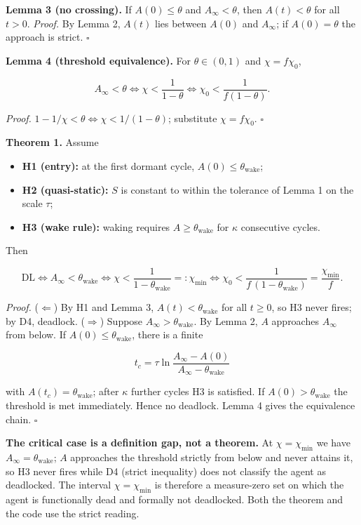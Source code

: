 \documentclass[11pt,a4paper]{article}
\providecommand{\tightlist}{\setlength{\itemsep}{0pt}\setlength{\parskip}{0pt}}
\begin{document}
\textbf{Lemma 3 (no crossing).} If \(A(0)\le\theta\) and \(A_\infty<\theta\), then
\(A(t)<\theta\) for all \(t>0\). \emph{Proof.} By Lemma 2, \(A(t)\) lies between \(A(0)\) and
\(A_\infty\); if \(A(0)=\theta\) the approach is strict. \(\square\)

\textbf{Lemma 4 (threshold equivalence).} For \(\theta\in(0,1)\) and \(\chi=f\chi_0\),

\[
A_\infty<\theta\iff\chi<\frac{1}{1-\theta}\iff\chi_0<\frac{1}{f(1-\theta)}.
\]

\emph{Proof.} \(1-1/\chi<\theta\iff\chi<1/(1-\theta)\); substitute \(\chi=f\chi_0\). \(\square\)

\textbf{Theorem 1.} Assume

\begin{itemize}
\tightlist
\item
  \textbf{H1 (entry):} at the first dormant cycle, \(A(0)\le\theta_{\mathrm{wake}}\);
\item
  \textbf{H2 (quasi-static):} \(S\) is constant to within the tolerance of Lemma 1 on
  the scale \(\tau\);
\item
  \textbf{H3 (wake rule):} waking requires \(A\ge\theta_{\mathrm{wake}}\) for \(\kappa\)
  consecutive cycles.
\end{itemize}

Then

\[
\mathrm{DL}\iff A_\infty<\theta_{\mathrm{wake}}
\iff \chi<\frac{1}{1-\theta_{\mathrm{wake}}}=:\chi_{\min}
\iff \chi_0<\frac{1}{f\,(1-\theta_{\mathrm{wake}})}=\frac{\chi_{\min}}{f}.
\]

\emph{Proof.} (\(\Leftarrow\)) By H1 and Lemma 3, \(A(t)<\theta_{\mathrm{wake}}\) for all
\(t\ge0\), so H3 never fires; by D4, deadlock. (\(\Rightarrow\)) Suppose
\(A_\infty>\theta_{\mathrm{wake}}\). By Lemma 2, \(A\) approaches \(A_\infty\) from
below. If \(A(0)\le\theta_{\mathrm{wake}}\), there is a finite

\[
t_c=\tau\ln\frac{A_\infty-A(0)}{A_\infty-\theta_{\mathrm{wake}}}
\]

with \(A(t_c)=\theta_{\mathrm{wake}}\); after \(\kappa\) further cycles H3 is
satisfied. If \(A(0)>\theta_{\mathrm{wake}}\) the threshold is met immediately.
Hence no deadlock. Lemma 4 gives the equivalence chain. \(\square\)

\textbf{The critical case is a definition gap, not a theorem.} At
\(\chi=\chi_{\min}\) we have \(A_\infty=\theta_{\mathrm{wake}}\); \(A\) approaches
the threshold strictly from below and never attains it, so H3 never fires while
D4 (strict inequality) does not classify the agent as deadlocked. The interval
\(\chi=\chi_{\min}\) is therefore a measure-zero set on which the agent is
functionally dead and formally not deadlocked. Both the theorem and the code use
the strict reading.
\end{document}
